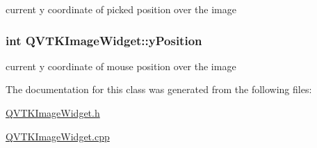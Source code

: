 current y coordinate of picked position over the image \hypertarget{class_q_v_t_k_image_widget_a6724caff3a614db8321deaa70532255c}{
\subsubsection[{y\-Position}]{\setlength{\rightskip}{0pt plus 5cm}int {\bf Q\-V\-T\-K\-Image\-Widget\-::y\-Position}}}\label{d8/dd7/class_q_v_t_k_image_widget_a6724caff3a614db8321deaa70532255c}
current y coordinate of mouse position over the image 

The documentation for this class was generated from the following files\-:\begin{DoxyCompactItemize}
\item 
\hyperlink{_q_v_t_k_image_widget_8h}{Q\-V\-T\-K\-Image\-Widget.\-h}\item 
\hyperlink{_q_v_t_k_image_widget_8cpp}{Q\-V\-T\-K\-Image\-Widget.\-cpp}\end{DoxyCompactItemize}
